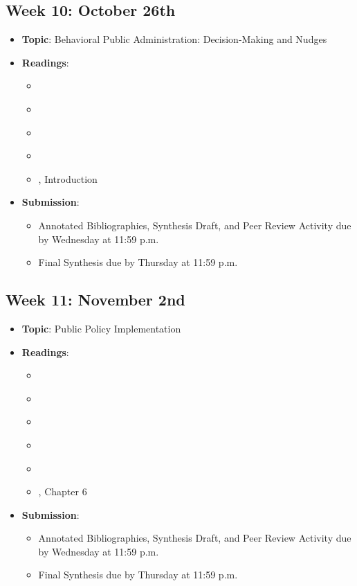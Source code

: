 \documentclass[12pt, letterpaper]{article}
\begin{document}
\subsection*{Week 10: October 26th}
    \begin{itemize}
        \item \textbf{Topic}: Behavioral Public Administration: Decision-Making and Nudges
        \item \textbf{Readings}:
            \begin{itemize}
                \item \cite{Caiden1981}
                \item \cite{Lindblom1959}
                \item \cite{Nutt2005}
                \item \cite{Pandey2010}
                \item \cite{thaler2009}, Introduction
            \end{itemize}
        \item \textbf{Submission}: 
            \begin{itemize}
                \item Annotated Bibliographies, Synthesis Draft, and Peer Review Activity due by Wednesday at 11:59 p.m. 
                \item Final Synthesis due by Thursday at 11:59 p.m.
            \end{itemize}
    \end{itemize}


\subsection*{Week 11: November 2nd}
    \begin{itemize}
        \item \textbf{Topic}: Public Policy Implementation
        \item \textbf{Readings}:
            \begin{itemize}
                \item \cite{Bardach1977}
                \item \cite{Head2019}
                \item \cite{Kingdon1995}
                \item \cite{May2007}
                \item \cite{Roman2015}
                \item \cite{Denhardt2015}, Chapter 6
            \end{itemize}
        \item \textbf{Submission}: 
                \begin{itemize}
                    \item Annotated Bibliographies, Synthesis Draft, and Peer Review Activity due by Wednesday at 11:59 p.m. 
                    \item Final Synthesis due by Thursday at 11:59 p.m.
                \end{itemize}
    \end{itemize}
\end{document}
